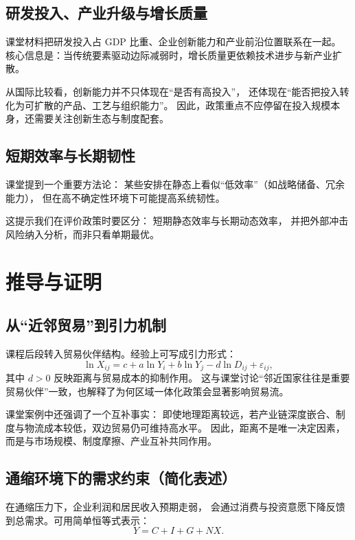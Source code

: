 \documentclass[UTF8,11pt,a4paper]{ctexart}
\begin{document}
\subsection{研发投入、产业升级与增长质量}

课堂材料把研发投入占 GDP 比重、企业创新能力和产业前沿位置联系在一起。
核心信息是：当传统要素驱动边际减弱时，增长质量更依赖技术进步与新产业扩散。

从国际比较看，创新能力并不只体现在“是否有高投入”，
还体现在“能否把投入转化为可扩散的产品、工艺与组织能力”。
因此，政策重点不应停留在投入规模本身，还需要关注创新生态与制度配套。

\subsection{短期效率与长期韧性}

课堂提到一个重要方法论：
某些安排在静态上看似“低效率”（如战略储备、冗余能力），
但在高不确定性环境下可能提高系统韧性。

这提示我们在评价政策时要区分：
短期静态效率与长期动态效率，
并把外部冲击风险纳入分析，而非只看单期最优。

\section{推导与证明}

\subsection{从“近邻贸易”到引力机制}

课程后段转入贸易伙伴结构。经验上可写成引力形式：
\begin{equation}
  \ln X_{ij} = c + a\ln Y_i + b\ln Y_j - d\ln D_{ij} + \varepsilon_{ij},
\end{equation}
其中 $d>0$ 反映距离与贸易成本的抑制作用。
这与课堂讨论“邻近国家往往是重要贸易伙伴”一致，也解释了为何区域一体化政策会显著影响贸易流。

课堂案例中还强调了一个互补事实：
即使地理距离较远，若产业链深度嵌合、制度与物流成本较低，双边贸易仍可维持高水平。
因此，距离不是唯一决定因素，而是与市场规模、制度摩擦、产业互补共同作用。

\subsection{通缩环境下的需求约束（简化表述）}

在通缩压力下，企业利润和居民收入预期走弱，
会通过消费与投资意愿下降反馈到总需求。可用简单恒等式表示：
\begin{equation}
  Y = C + I + G + NX.
\end{equation}
\end{document}
